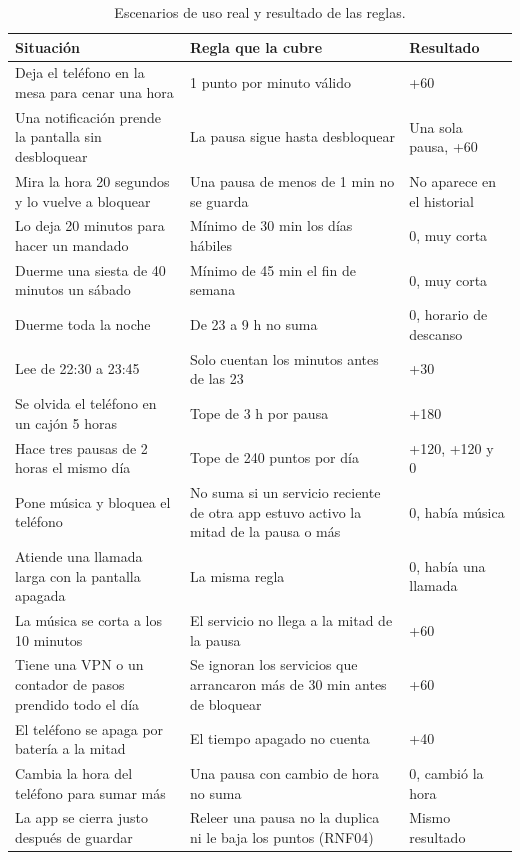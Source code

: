 \begin{table}[H]
\centering
\begin{tabularx}{\linewidth}{@{}L L L@{}}
\toprule
Situación & Regla que la cubre & Resultado \\
\midrule
Deja el teléfono en la mesa para cenar una hora & 1 punto por minuto válido & +60 \\
Una notificación prende la pantalla sin desbloquear & La pausa sigue hasta desbloquear & Una sola pausa, +60 \\
Mira la hora 20 segundos y lo vuelve a bloquear & Una pausa de menos de 1 min no se guarda & No aparece en el historial \\
Lo deja 20 minutos para hacer un mandado & Mínimo de 30 min los días hábiles & 0, muy corta \\
Duerme una siesta de 40 minutos un sábado & Mínimo de 45 min el fin de semana & 0, muy corta \\
Duerme toda la noche & De 23 a 9 h no suma & 0, horario de descanso \\
Lee de 22:30 a 23:45 & Solo cuentan los minutos antes de las 23 & +30 \\
Se olvida el teléfono en un cajón 5 horas & Tope de 3 h por pausa & +180 \\
Hace tres pausas de 2 horas el mismo día & Tope de 240 puntos por día & +120, +120 y 0 \\
Pone música y bloquea el teléfono & No suma si un servicio reciente de otra app estuvo activo la mitad de la pausa o más & 0, había música \\
Atiende una llamada larga con la pantalla apagada & La misma regla & 0, había una llamada \\
La música se corta a los 10 minutos & El servicio no llega a la mitad de la pausa & +60 \\
Tiene una VPN o un contador de pasos prendido todo el día & Se ignoran los servicios que arrancaron más de 30 min antes de bloquear & +60 \\
El teléfono se apaga por batería a la mitad & El tiempo apagado no cuenta & +40 \\
Cambia la hora del teléfono para sumar más & Una pausa con cambio de hora no suma & 0, cambió la hora \\
La app se cierra justo después de guardar & Releer una pausa no la duplica ni le baja los puntos (RNF04) & Mismo resultado \\
\bottomrule
\end{tabularx}
\caption{Escenarios de uso real y resultado de las reglas.}
\end{table}

